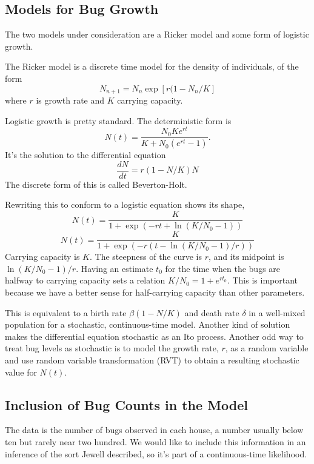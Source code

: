 \documentclass{article}
\begin{document}
\subsection{Models for Bug Growth}
The two models under consideration are a Ricker model and some form
of logistic growth.

The Ricker model is a discrete time model for the density of individuals,
of the form
\begin{equation}
  N_{n+1}=N_n\exp\left[r(1-N_n/K\right]
\end{equation}
where $r$ is growth rate and $K$ carrying capacity.

Logistic growth is pretty standard. The deterministic form is
\begin{equation}
N(t)=\frac{N_0Ke^{rt}}{K+N_0(e^{rt}-1)}.
\end{equation}
It's the solution to the differential equation
\begin{equation}
  \frac{dN}{dt}=r\left(1-N/K\right)N
\end{equation}
The discrete form of this is called Beverton-Holt.

Rewriting this to conform to a logistic equation shows
its shape,
\begin{equation}
N(t)=\frac{K}{1+\exp\left(-rt+\ln(K/N_0-1)\right)}
\end{equation}
\begin{equation}
N(t)=\frac{K}{1+\exp\left(-r(t-\ln(K/N_0-1)/r)\right)}
\end{equation}
Carrying capacity is $K$.
The steepness of the curve is $r$, and its midpoint
is $\ln(K/N_0-1)/r$. Having an estimate $t_0$ for
the time when the bugs are halfway to carrying capacity
sets a relation $K/N_0=1+e^{rt_0}$. This is important because
we have a better sense for half-carrying capacity than other parameters.

This is equivalent to a birth rate $\beta(1-N/K)$ and death rate $\delta$
in a well-mixed population for a stochastic, continuous-time model.
Another kind of solution makes the differential equation stochastic
as an Ito process. Another odd way to treat bug levels as stochastic
is to model the growth rate, $r$, as a random variable and 
use random variable transformation (RVT) to obtain a resulting
stochastic value for $N(t)$.

\subsection{Inclusion of Bug Counts in the Model}
The data is the number of bugs observed in each house, a number
usually below ten but rarely near two hundred. We would like to include
this information in an inference of the sort Jewell described, so
it's part of a continuous-time likelihood.
\end{document}
